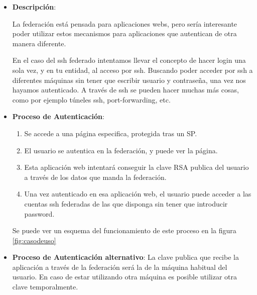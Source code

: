     \begin{itemize}

    \item \textbf{Descripción}:
    
    La federación está pensada para aplicaciones webs, pero sería
    interesante poder utilizar estos mecanismos para aplicaciones que
    autentican de otra manera diferente.

    En el caso del ssh federado intentamos llevar el concepto de hacer
    login una sola vez, y en tu entidad, al acceso por ssh. Buscando poder
    acceder por ssh a diferentes máquinas sin tener que escribir usuario y
    contraseña, una vez nos hayamos autenticado.  A través de ssh se pueden
    hacer muchas más cosas, como por ejemplo túneles ssh, port-forwarding,
    etc.

    \item \textbf{Proceso de Autenticación}:
    \label{casouso}

    \begin{enumerate}

        \item Se accede a una página especifica, protegida tras un SP.

        \item El usuario se autentica en la federación, y puede ver la
        página.

        \item Esta aplicación web intentará conseguir la clave RSA publica
        del usuario a través de los datos que manda la federación.

        \item Una vez autenticado en esa aplicación web, el usuario puede
        acceder a las cuentas ssh federadas de las que disponga sin tener
        que introducir password.

    \end{enumerate}

    Se puede ver un esquema del funcionamiento de este proceso en la figura
    \ref{fig:casodeuso}

    \item \textbf{Proceso de Autenticación alternativo}:
    La clave publica que recibe la aplicación a través de la federación
    será la de la máquina habitual del usuario. En caso de estar utilizando
    otra máquina es posible utilizar otra clave temporalmente.

    \begin{enumerate}


\end{enumerate}
\end{itemize}
